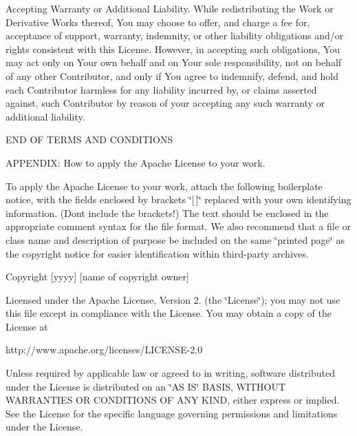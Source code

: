 \begin{DoxyEnumerate}
\item Accepting Warranty or Additional Liability. While redistributing the Work or Derivative Works thereof, You may choose to offer, and charge a fee for, acceptance of support, warranty, indemnity, or other liability obligations and/or rights consistent with this License. However, in accepting such obligations, You may act only on Your own behalf and on Your sole responsibility, not on behalf of any other Contributor, and only if You agree to indemnify, defend, and hold each Contributor harmless for any liability incurred by, or claims asserted against, such Contributor by reason of your accepting any such warranty or additional liability.
\end{DoxyEnumerate}

E\+ND OF T\+E\+R\+MS A\+ND C\+O\+N\+D\+I\+T\+I\+O\+NS

A\+P\+P\+E\+N\+D\+IX\+: How to apply the Apache License to your work.

To apply the Apache License to your work, attach the following boilerplate notice, with the fields enclosed by brackets \char`\"{}\mbox{[}$\,$\mbox{]}\char`\"{} replaced with your own identifying information. (Don\textquotesingle{}t include the brackets!) The text should be enclosed in the appropriate comment syntax for the file format. We also recommend that a file or class name and description of purpose be included on the same \char`\"{}printed page\char`\"{} as the copyright notice for easier identification within third-\/party archives.

Copyright \mbox{[}yyyy\mbox{]} \mbox{[}name of copyright owner\mbox{]}

Licensed under the Apache License, Version 2. (the \char`\"{}\+License\char`\"{}); you may not use this file except in compliance with the License. You may obtain a copy of the License at \begin{DoxyVerb}http://www.apache.org/licenses/LICENSE-2.0
\end{DoxyVerb}


Unless required by applicable law or agreed to in writing, software distributed under the License is distributed on an \char`\"{}\+A\+S I\+S\char`\"{} B\+A\+S\+IS, W\+I\+T\+H\+O\+UT W\+A\+R\+R\+A\+N\+T\+I\+ES OR C\+O\+N\+D\+I\+T\+I\+O\+NS OF A\+NY K\+I\+ND, either express or implied. See the License for the specific language governing permissions and limitations under the License. 